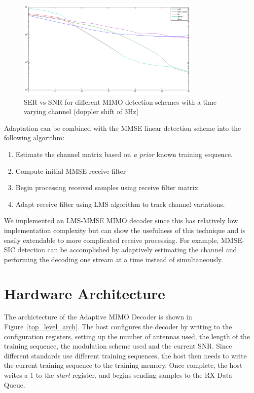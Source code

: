 \documentclass[journal]{IEEEtran}
\begin{document}
\begin{figure}
\centering
\includegraphics[width=9cm]{images/time_varying_channel_doppler_3.png}
\caption{SER vs SNR for different MIMO detection schemes with a time varying channel (doppler shift of 3Hz)}
\label{ser_snr_different_schemes_dynamic}
\end{figure}

Adaptation can be combined with the MMSE linear detection scheme into the following algorithm:
\begin{enumerate}
\item Estimate the channel matrix based on {\em a prior} known training sequence.
\item Compute initial MMSE receive filter
\item Begin processing received samples using receive filter matrix.
\item Adapt receive filter using LMS algorithm to track channel variations.
\end{enumerate}

We implemented an LMS-MMSE MIMO decoder since this has relatively low implementation complexity but can show the usefulness of this technique and is easily extendable to more complicated receive processing. For example, MMSE-SIC detection can be accomplished by adaptively estimating the channel and performing the decoding one stream at a time instead of simultaneously. 

\section{Hardware Architecture}

The archictecture of the Adaptive MIMO Decoder is shown in Figure~\ref{top_level_arch}. The host configures the decoder by writing to the configuration registers, setting up the number of antennas used, the length of the training sequence, the modulation scheme used and the current SNR. Since different standards use different training sequences, the host then needs to write the current training sequence to the training memory. Once complete, the host writes a 1 to the {\em start} register, and begins sending samples to the RX Data Queue.
\end{document}
